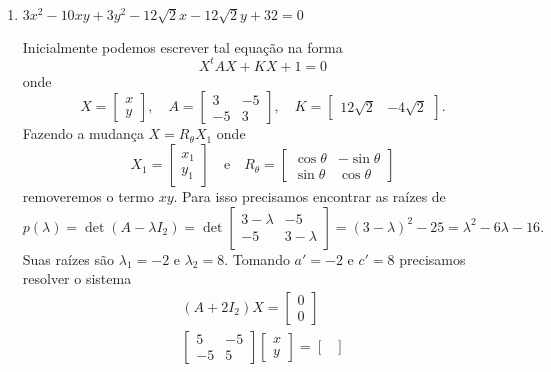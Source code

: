 \begin{exemplos}
\begin{enumerate}
    \item $3x^2 - 10xy + 3y^2 - 12\sqrt{2}x - 12\sqrt{2}y + 32 = 0$
    \begin{solucao}
      Inicialmente podemos escrever tal equação na forma
      \[
        X^t A X + KX + 1 = 0
      \]
      onde
      \[
        X = \begin{bmatrix}
          x\\y
        \end{bmatrix}, \quad A = \begin{bmatrix}
          3 & -5\\
          -5 & 3
        \end{bmatrix},\quad K = \begin{bmatrix}
          12\sqrt{2} & -4\sqrt{2}
        \end{bmatrix}.
      \]
      Fazendo a mudança $X = R_\theta X_1$ onde
      \[
        X_1 = \begin{bmatrix}
          x_1 \\y_1
        \end{bmatrix} \quad\mbox{e}\quad R_\theta = \begin{bmatrix}
          \cos\theta & -\sin\theta\\
          \sin\theta & \cos\theta
        \end{bmatrix}
      \]
      removeremos o termo $xy$. Para isso precisamos encontrar as raízes de
      \[
        p(\lambda) = \det (A - \lambda I_2) = \det \begin{bmatrix}
          3 - \lambda & -5\\
          -5 & 3 - \lambda
        \end{bmatrix} = (3 - \lambda)^2 - 25 = \lambda^2 - 6\lambda - 16.
      \]
      Suas raízes são $\lambda_1 = -2$ e $\lambda_2 = 8$. Tomando $a' = -2$ e $c' = 8$ precisamos resolver o sistema
      \begin{align*}
        (A + 2I_2)X = \begin{bmatrix}
          0\\0
        \end{bmatrix}\\
        \begin{bmatrix}
          5 & -5\\
          -5 & 5
        \end{bmatrix} \begin{bmatrix}
          x \\y
        \end{bmatrix} = \begin{bmatrix}

\end{bmatrix}
\end{align*}
\end{solucao}
\end{enumerate}
\end{exemplos}
